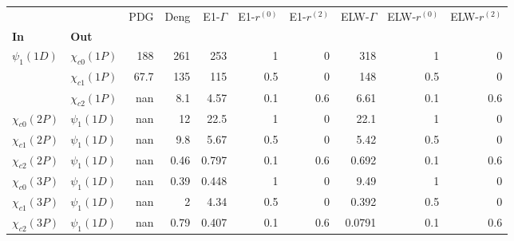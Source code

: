 \begin{tabular}{l|l|r|r|r|r|r|r|r|r}
\toprule
                &                &  PDG &  Deng &  E1-$\Gamma$ &  E1-$r^{(0)}$ &  E1-$r^{(2)}$ &  ELW-$\Gamma$ &  ELW-$r^{(0)}$ &  ELW-$r^{(2)}$ \\
\textbf{In} & \textbf{Out} &      &       &              &               &               &               &                &                \\
\midrule
\textbf{$\psi_{1}(1D)$} & \textbf{$\chi_{c0}(1P)$} &  188 &   261 &          253 &             1 &             0 &           318 &              1 &              0 \\
                & \textbf{$\chi_{c1}(1P)$} & 67.7 &   135 &          115 &           0.5 &             0 &           148 &            0.5 &              0 \\
                & \textbf{$\chi_{c2}(1P)$} &  nan &   8.1 &         4.57 &           0.1 &           0.6 &          6.61 &            0.1 &            0.6 \\
\textbf{$\chi_{c0}(2P)$} & \textbf{$\psi_{1}(1D)$} &  nan &    12 &         22.5 &             1 &             0 &          22.1 &              1 &              0 \\
\textbf{$\chi_{c1}(2P)$} & \textbf{$\psi_{1}(1D)$} &  nan &   9.8 &         5.67 &           0.5 &             0 &          5.42 &            0.5 &              0 \\
\textbf{$\chi_{c2}(2P)$} & \textbf{$\psi_{1}(1D)$} &  nan &  0.46 &        0.797 &           0.1 &           0.6 &         0.692 &            0.1 &            0.6 \\
\textbf{$\chi_{c0}(3P)$} & \textbf{$\psi_{1}(1D)$} &  nan &  0.39 &        0.448 &             1 &             0 &          9.49 &              1 &              0 \\
\textbf{$\chi_{c1}(3P)$} & \textbf{$\psi_{1}(1D)$} &  nan &     2 &         4.34 &           0.5 &             0 &         0.392 &            0.5 &              0 \\
\textbf{$\chi_{c2}(3P)$} & \textbf{$\psi_{1}(1D)$} &  nan &  0.79 &        0.407 &           0.1 &           0.6 &        0.0791 &            0.1 &            0.6 \\
\bottomrule
\end{tabular}
